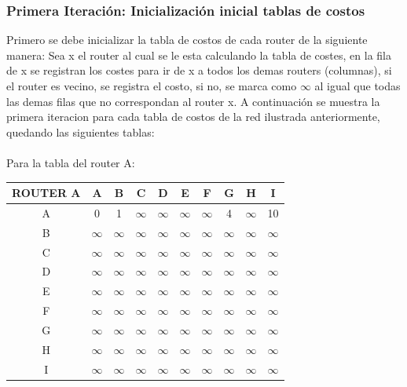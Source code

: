 \documentclass{article}
\begin{document}
\subsubsection*{Primera Iteración: Inicialización inicial tablas de costos}
Primero se debe inicializar la tabla de costos de cada router de la siguiente manera: Sea x el router al cual se le esta calculando la tabla de costes, en la fila de x se registran los costes para ir de x a todos los demas routers (columnas), si el router es vecino, se registra el costo, si no, se marca como $\infty$ al igual que todas las demas filas que no correspondan al router x. A continuación se muestra la primera iteracion para cada tabla de costos de la red ilustrada anteriormente, quedando las siguientes tablas:\\
\\
Para la tabla del router A:\\
\begin{tabular}{ | c | c | c | c | c | c | c | c | c | c |}
\hline                 
ROUTER A    & A      & B      & C      & D      & E      & F      & G      & H      & I      \\
\hline
        A   & 0      & 1      &$\infty$&$\infty$&$\infty$&$\infty$& 4      &$\infty$& 10     \\
\hline
        B   &$\infty$&$\infty$&$\infty$&$\infty$&$\infty$&$\infty$&$\infty$&$\infty$&$\infty$\\
\hline
        C   &$\infty$&$\infty$&$\infty$&$\infty$&$\infty$&$\infty$&$\infty$&$\infty$&$\infty$\\
\hline
        D   &$\infty$&$\infty$&$\infty$&$\infty$&$\infty$&$\infty$&$\infty$&$\infty$&$\infty$\\
\hline
        E   &$\infty$&$\infty$&$\infty$&$\infty$&$\infty$&$\infty$&$\infty$&$\infty$&$\infty$\\
\hline
        F   &$\infty$&$\infty$&$\infty$&$\infty$&$\infty$&$\infty$&$\infty$&$\infty$&$\infty$\\
\hline
        G   &$\infty$&$\infty$&$\infty$&$\infty$&$\infty$&$\infty$&$\infty$&$\infty$&$\infty$\\
\hline
        H   &$\infty$&$\infty$&$\infty$&$\infty$&$\infty$&$\infty$&$\infty$&$\infty$&$\infty$\\
\hline 
        I   &$\infty$&$\infty$&$\infty$&$\infty$&$\infty$&$\infty$&$\infty$&$\infty$&$\infty$\\
\hline
\end{tabular}
\\\\
\end{document}
